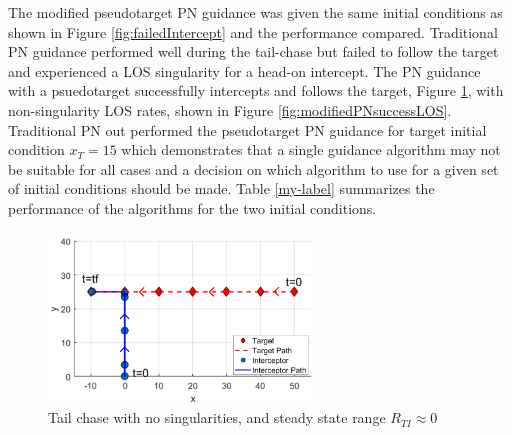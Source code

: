 \documentclass[conference]{IEEEtran}
\providecommand{\DIFdelbegin}{} %
\providecommand{\DIFdelend}{} %
\newcommand{\DIFscaledelfig}{0.5}
\newlength{\DIFdelgraphicswidth} %
\newlength{\DIFdelgraphicsheight} %
\newcommand{\DIFdelincludegraphics}[2][]{%
\sbox{\DIFdelgraphicsbox}{\DIFOincludegraphics[#1]{#2}}%
\settoboxwidth{\DIFdelgraphicswidth}{\DIFdelgraphicsbox} %
\settoboxtotalheight{\DIFdelgraphicsheight}{\DIFdelgraphicsbox} %
\scalebox{\DIFscaledelfig}{%
\parbox[b]{\DIFdelgraphicswidth}{\usebox{\DIFdelgraphicsbox}\\[-\baselineskip] \rule{\DIFdelgraphicswidth}{0em}}\llap{\resizebox{\DIFdelgraphicswidth}{\DIFdelgraphicsheight}{%
\setlength{\unitlength}{\DIFdelgraphicswidth}%
\begin{picture}(1,1)%
\thicklines\linethickness{2pt} %
{\color[rgb]{1,0,0}\put(0,0){\framebox(1,1){}}}%
{\color[rgb]{1,0,0}\put(0,0){\line( 1,1){1}}}%
{\color[rgb]{1,0,0}\put(0,1){\line(1,-1){1}}}%
\end{picture}%
}\hspace*{3pt}}} %
} %
\DeclareRobustCommand{\DIFdelbegin}{\DIFOdelbegin \let\includegraphics\DIFdelincludegraphics} %
\DeclareRobustCommand{\DIFdelend}{\DIFOaddend \let\includegraphics\DIFOincludegraphics} %
\begin{document}
\DIFdelbegin %

\DIFdelend The modified pseudotarget PN guidance was given the same initial conditions as shown in Figure \ref{fig:failedIntercept} and the performance compared. Traditional PN guidance performed well during the tail-chase but failed to follow the target and experienced a LOS singularity for a head-on intercept. The PN guidance with a psuedotarget successfully intercepts and follows the target, Figure \ref{fig:modifiedPNsuccess}, with non-singularity LOS rates, shown in Figure \ref{fig:modifiedPNsuccessLOS}. Traditional PN out performed the pseudotarget PN guidance for target initial condition $x_{T} = 15$ which demonstrates that a single guidance algorithm may not be suitable for all cases and a decision on which algorithm to use for a given set of initial conditions should be made. Table \ref{my-label} summarizes the performance of the algorithms for the two initial conditions.


\begin{figure}[H]
	\centering
	\includegraphics[width=7cm] {fixedSingularity}
	\caption{Tail chase with no singularities, and steady state range $R_{TI}\approx0$}
	\label{fig:modifiedPNsuccess}
	\hspace*{0mm}
\end{figure}
\end{document}
